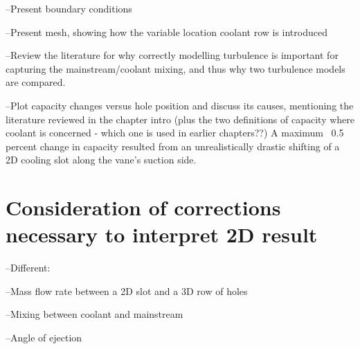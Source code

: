 \documentclass[11pt, twoside]{report}
\begin{document}
--Present boundary conditions

--Present mesh, showing how the variable location coolant row is introduced

--Review the literature for why correctly modelling turbulence is important for capturing the mainstream/coolant mixing, and thus why two turbulence models are compared.

--Plot capacity changes versus hole position and discuss its causes, mentioning the literature reviewed in the chapter intro (plus the two definitions of capacity where coolant is concerned - which one is used in earlier chapters??) A maximum ~0.5 percent change in capacity resulted from an unrealistically drastic shifting of a 2D cooling slot along the vane’s suction side.

    
\section{Consideration of corrections necessary to interpret 2D result}

--Different:

--Mass flow rate between a 2D slot and a 3D row of holes

--Mixing between coolant and mainstream

--Angle of ejection







\end{document}
